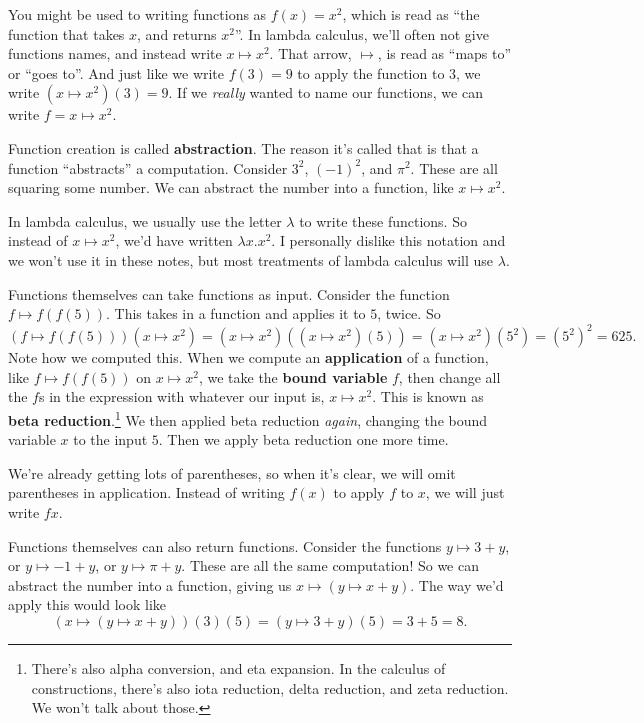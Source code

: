 \documentclass[11pt,paper=letter]{scrartcl}
\begin{document}
You might be used to writing functions as $f(x) = x^2$, which is read as ``the function that takes $x$, and returns $x^2$''. In lambda calculus, we'll often not give functions names, and instead write $x \mapsto x^2$. That arrow, $\mapsto$, is read as ``maps to'' or ``goes to''. And just like we write $f(3) = 9$ to apply the function to $3$, we write $(x \mapsto x^2)(3) = 9$. If we \emph{really} wanted to name our functions, we can write $f = x \mapsto x^2$.

Function creation is called \textbf{abstraction}. The reason it's called that is that a function ``abstracts'' a computation. Consider $3^2$, $(-1)^2$, and $\pi^2$. These are all squaring some number. We can abstract the number into a function, like $x \mapsto x^2$.

In lambda calculus, we usually use the letter $\lambda$ to write these functions. So instead of $x \mapsto x^2$, we'd have written $\lambda x.x^2$. I personally dislike this notation and we won't use it in these notes, but most treatments of lambda calculus will use $\lambda$.

Functions themselves can take functions as input. Consider the function $f \mapsto f(f(5))$. This takes in a function and applies it to $5$, twice. So \[
  (f \mapsto f(f(5)))(x \mapsto x^2)
  = (x \mapsto x^2)((x \mapsto x^2)(5))
  = (x \mapsto x^2)(5^2)
  = (5^2)^2
  = 625.
\]
Note how we computed this. When we compute an \textbf{application} of a function, like $f \mapsto f(f(5))$ on $x \mapsto x^2$, we take the \textbf{bound variable} $f$, then change all the $f$s in the expression with whatever our input is, $x \mapsto x^2$. This is known as \textbf{beta reduction}.\footnote{There's also alpha conversion, and eta expansion. In the calculus of constructions, there's also iota reduction, delta reduction, and zeta reduction. We won't talk about those.} We then applied beta reduction \emph{again}, changing the bound variable $x$ to the input $5$. Then we apply beta reduction one more time.

We're already getting lots of parentheses, so when it's clear, we will omit parentheses in application. Instead of writing $f(x)$ to apply $f$ to $x$, we will just write $fx$.

Functions themselves can also return functions. Consider the functions $y \mapsto 3 + y$, or $y \mapsto -1 + y$, or $y \mapsto \pi + y$. These are all the same computation! So we can abstract the number into a function, giving us $x \mapsto (y \mapsto x + y)$. The way we'd apply this would look like \[
  (x \mapsto (y \mapsto x + y))(3)(5)
  = (y \mapsto 3 + y)(5)
  = 3 + 5
  = 8.
\]
\end{document}
